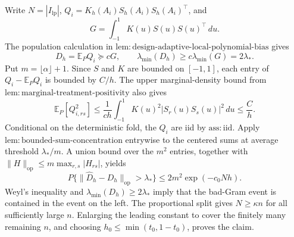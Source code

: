 Write \(N=|I_{\mathrm{lp}}|\), \(Q_i=K_h(A_i)S_h(A_i)S_h(A_i)^\top\), and
\[
G=\int_{-1}^1K(u)S(u)S(u)^\top\,du.
\]
The population calculation in \(\mathrm{lem:design\text{-}adaptive\text{-}local\text{-}polynomial\text{-}bias}\) gives
\[
D_h=\mathbb E_PQ_i\succeq cG,
\qquad
\lambda_{\min}(D_h)\ge c\lambda_{\min}(G)=2\lambda_*.
\]
Put \(m=\lfloor\alpha\rfloor+1\). Since \(S\) and \(K\) are bounded on \([-1,1]\), each entry of \(Q_i-\mathbb E_PQ_i\) is bounded by \(C/h\). The upper marginal-density bound from \(\mathrm{lem:marginal\text{-}treatment\text{-}positivity}\) also gives
\[
\mathbb E_P[Q_{i,rs}^2]
\le \frac{1}{ch}\int_{-1}^1K(u)^2|S_r(u)S_s(u)|^2\,du
\le \frac Ch.
\]
Conditional on the deterministic fold, the \(Q_i\) are iid by \(\mathrm{ass:iid}\). Apply \(\mathrm{lem:bounded\text{-}sum\text{-}concentration}\) entrywise to the centered sums at average threshold \(\lambda_*/m\). A union bound over the \(m^2\) entries, together with \(\|H\|_{\mathrm{op}}\le m\max_{r,s}|H_{rs}|\), yields
\[
P\{\|\widehat D_h-D_h\|_{\mathrm{op}}>\lambda_*\}
\le2m^2\exp(-c_0Nh).
\]
Weyl's inequality and \(\lambda_{\min}(D_h)\ge2\lambda_*\) imply that the bad-Gram event is contained in the event on the left. The proportional split gives \(N\ge\kappa n\) for all sufficiently large \(n\). Enlarging the leading constant to cover the finitely many remaining \(n\), and choosing \(h_0\le\min(t_0,1-t_0)\), proves the claim.
